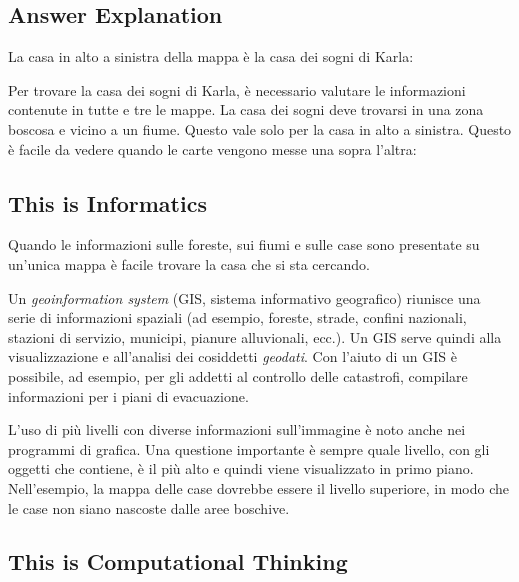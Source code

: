 \documentclass[a4paper,11pt]{report}
\newcommand{\taskGraphicsFolder}{..}
\begin{document}
\endgroup

\subsection*{Answer Explanation}

La casa in alto a sinistra della mappa è la casa dei sogni di Karla:

{\centering%
\par}

Per trovare la casa dei sogni di Karla, è necessario valutare le informazioni contenute in tutte e tre le mappe. La casa dei sogni deve trovarsi in una zona boscosa e vicino a un fiume. Questo vale solo per la casa in alto a sinistra. Questo è facile da vedere quando le carte vengono messe una sopra l’altra:

{\centering%
\par}


\subsection*{This is Informatics}

Quando le informazioni sulle foreste, sui fiumi e sulle case sono presentate su un’unica mappa è facile trovare la casa che si sta cercando.

Un \emph{geoinformation system} (GIS, sistema informativo geografico) riunisce una serie di informazioni spaziali (ad esempio, foreste, strade, confini nazionali, stazioni di servizio, municipi, pianure alluvionali, ecc.). Un GIS serve quindi alla visualizzazione e all’analisi dei cosiddetti \emph{geodati}. Con l’aiuto di un GIS è possibile, ad esempio, per gli addetti al controllo delle catastrofi, compilare informazioni per i piani di evacuazione.

L’uso di più livelli con diverse informazioni sull’immagine è noto anche nei programmi di grafica. Una questione importante è sempre quale livello, con gli oggetti che contiene, è il più alto e quindi viene visualizzato in primo piano. Nell’esempio, la mappa delle case dovrebbe essere il livello superiore, in modo che le case non siano nascoste dalle aree boschive.


\subsection*{This is Computational Thinking}
\end{document}
